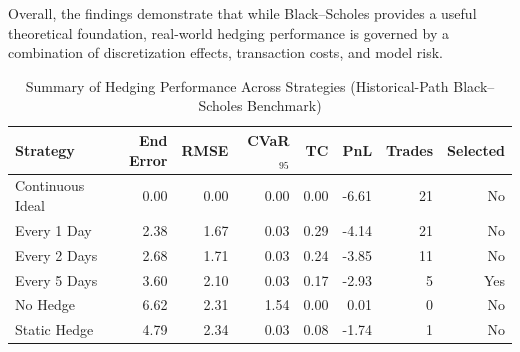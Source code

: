 \documentclass{article}
\begin{document}
Overall, the findings demonstrate that while Black--Scholes provides a useful theoretical foundation, real-world hedging performance is governed by a combination of discretization effects, transaction costs, and model risk.
\begin{table}[h]
\centering
\caption{Summary of Hedging Performance Across Strategies (Historical-Path Black--Scholes Benchmark)}
\begin{tabular}{lrrrrrrr}
\hline
\textbf{Strategy} & \textbf{End Error} & \textbf{RMSE} & \textbf{CVaR$_{95}$} & \textbf{TC} & \textbf{PnL} & \textbf{Trades} & \textbf{Selected} \\
\hline
Continuous Ideal & 0.00 & 0.00 & 0.00 & 0.00 & -6.61 & 21 & No \\
Every 1 Day      & 2.38 & 1.67 & 0.03 & 0.29 & -4.14 & 21 & No \\
Every 2 Days     & 2.68 & 1.71 & 0.03 & 0.24 & -3.85 & 11 & No \\
Every 5 Days     & 3.60 & 2.10 & 0.03 & 0.17 & -2.93 & 5  & Yes \\
No Hedge         & 6.62 & 2.31 & 1.54 & 0.00 & 0.01 & 0 & No \\
Static Hedge     & 4.79 & 2.34 & 0.03 & 0.08 & -1.74 & 1 & No \\
\hline
\end{tabular}
\label{tab:hedging_summary}
\end{table}

\begin{table}[h]
\centering
\caption{Representative Yahoo Finance SPY Option Contracts}
\label{tab:yahoo_contract_summary}
\end{table}
\end{document}
